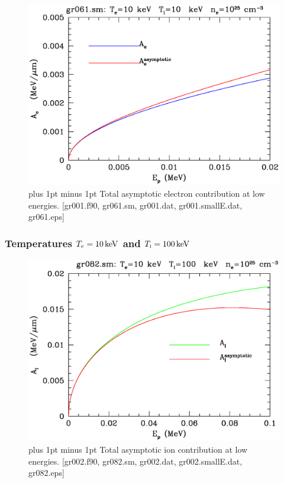 \documentclass[preprint,12pt,eqsecnum,nofootinbib,amsmath,amssymb]{revtex4}
\newcommand{\smI}{{\rm\scriptscriptstyle I}}
\newcommand{\footnoteskip}{\baselineskip 12pt plus 1pt minus 1pt}
\begin{document}
\vskip-2cm 
\begin{figure}[h!]
\includegraphics[scale=0.45]{gr061.eps} 
\vskip-0.8cm 
\caption{\footnoteskip  
  Total asymptotic electron contribution at low energies. 
 [gr001.f90, gr061.sm,
    gr001.dat, gr001.smallE.dat, gr061.eps]
}
\label{fig:gr061}
\end{figure}


\pagebreak
\subsubsection{Temperatures $T_e=10\,{\rm keV}$ and $T_\smI=100\,{\rm keV}$}

\vskip-2cm 
\begin{figure}[h!]
\includegraphics[scale=0.45]{gr082.eps} 
\vskip-0.8cm 
\caption{\footnoteskip  
  Total asymptotic ion contribution at low energies. 
 [gr002.f90, gr082.sm, gr002.dat, gr002.smallE.dat, gr082.eps]
}
\label{fig:gr082}
\end{figure}
\end{document}
